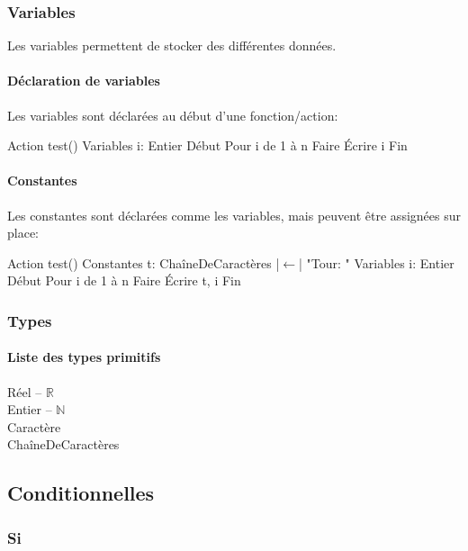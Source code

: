 \documentclass[10pt,a4paper,french]{article}
\begin{document}
\subsubsection{Variables}

Les variables permettent de stocker des différentes données.

\paragraph{Déclaration de variables}
Les variables sont déclarées au début d'une fonction/action:
\begin{exalgo}
Action test()
Variables
    i: Entier
Début
    Pour i de 1 à n Faire
        Écrire i
Fin
\end{exalgo}

\paragraph{Constantes}
Les constantes sont déclarées comme les variables, mais peuvent être assignées sur place:
\begin{exalgo}
Action test()
Constantes
    t: ChaîneDeCaractères |$\leftarrow$| "Tour: "
Variables
    i: Entier
Début
    Pour i de 1 à n Faire
        Écrire t, i
Fin
\end{exalgo}

\subsubsection{Types}

\paragraph{Liste des types primitifs}
\begin{description}
\item[Réel -- $\mathbb{R}$]
\item[Entier -- $\mathbb{N}$]
\item[Caractère]
\item[ChaîneDeCaractères]
\end{description}

\subsection{Conditionnelles}

\subsubsection{Si}
\end{document}
